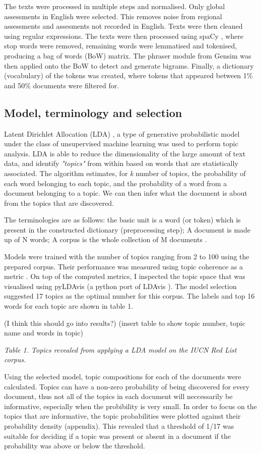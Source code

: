 The texts were processed in multiple steps and normalised. Only global assessments in English were selected. This removes noise from regional assessments and assesments not recorded in English. Texts were then cleaned using regular expressions. The texts were then processed using spaCy \parencite{spacy}, where stop words were removed, remaining words were lemmatised and tokenised, producing a bag of words (BoW) matrix. The phraser module from Gensim \parencite{rehurek_lrec} was then applied onto the BoW to detect and generate bigrams. Finally, a dictionary (vocabulary) of the tokens was created, where tokens that appeared between 1\% and 50\% documents were filtered for. 

\subsection{Model, terminology and selection}

Latent Dirichlet Allocation (LDA) \parencite{blei2003latent}, a type of generative probabilistic model under the class of unsupervised machine learning was used to perform topic analysis. LDA is able to reduce the dimensionality of the large amount of text data, and identify \textit{"topics"} from within based on words that are statistically associated. The algorithm estimates, for \textit{k} number of topics, the probability of each word belonging to each topic, and the probability of a word from a document belonging to a topic. We can then infer what the document is about from the topics that are discovered. 

The terminologies are as follows: the basic unit is a word (or token) which is present in the constructed dictionary (preprocessing step); A document is made up of N words; A corpus is the whole collection of M documents \parencite{blei2003latent}.

Models were trained with the number of topics ranging from 2 to 100 using the prepared corpus. Their performance was measured using topic coherence as a metric \parencite{roder2015exploring}. On top of the computed metrics, I inspected the topic space that was visualised using pyLDAvis (a python port of LDAvis \parencite{sievert2014ldavis}). The model selection suggested 17 topics as the optimal number for this corpus. The labels and top 16 words for each topic are shown in table 1.

(I think this should go into results?)
(insert table to show topic number, topic name and words in topic)

\textit{Table 1. Topics revealed from applying a LDA model on the IUCN Red List corpus.}

Using the selected model, topic compositions for each of the documents were calculated. Topics can have a non-zero probability of being discovered for every document, thus not all of the topics in each document will neccessarily be informative, especially when the probibility is very small. In order to focus on the topics that are informative, the topic probabilities were plotted against their probability density (appendix). This revealed that a threshold of 1/17 was suitable for deciding if a topic was present or absent in a document if the probability was above or below the threshold.